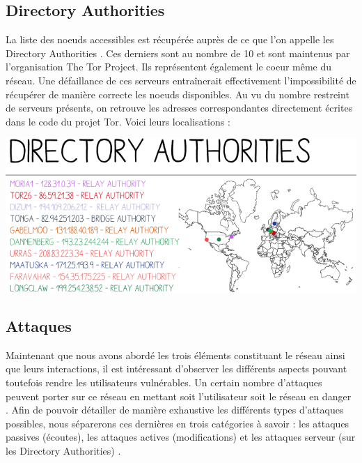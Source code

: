 \documentclass[letterpaper]{article}
\begin{document}
\subsection{Directory Authorities} La liste des noeuds accessibles est récupérée auprès de ce que l'on appelle les Directory Authorities \cite{ref1}. Ces derniers sont au nombre de 10 et sont maintenus par l'organisation The Tor Project. Ils représentent également le coeur même du réseau. Une défaillance de ces serveurs entraînerait effectivement l'impossibilité de récupérer de manière correcte les noeuds disponibles. Au vu du nombre restreint de serveurs présents, on retrouve les adresses correspondantes directement écrites dans le code du projet Tor. Voici leurs localisations : \vspace{0.2cm}
\begin{center}
\includegraphics[scale=0.38]{image2} \vspace{0.3cm}
\end{center} 

\subsection{Attaques}
Maintenant que nous avons abordé les trois éléments constituant le réseau ainsi que leurs interactions, il est intéressant d'observer les différents aspects pouvant toutefois rendre les utilisateurs vulnérables. Un certain nombre d'attaques peuvent porter sur ce réseau en mettant soit l'utilisateur soit le réseau en danger \cite{ref14}. Afin de pouvoir détailler de manière exhaustive les différents types d'attaques possibles, nous séparerons ces dernières en trois catégories à savoir : les attaques passives (écoutes), les attaques actives (modifications) et les attaques serveur (sur les Directory Authorities) \cite{ref14}.
\end{document}
